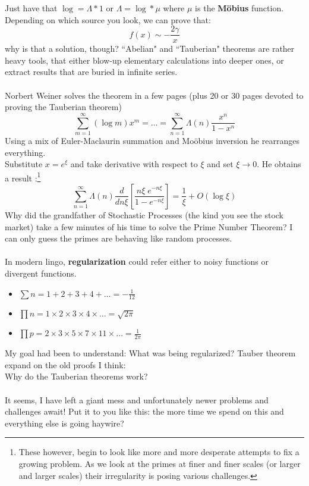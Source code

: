 \documentclass[12pt]{article}
\begin{document}
\newpage

\noindent Just have that $\log = \Lambda \ast 1$ or $\Lambda = \log \ast \mu $ where $\mu$ is the \textbf{M\"{o}bius} function.   Depending on which source you look, we can prove that:
$$ f(x) \sim -\frac{2\gamma}{x} $$
why is that a solution, though?  ``Abelian" and ``Tauberian" theorems are rather heavy tools, that either blow-up elementary calculations into deeper ones, or extract results that are buried in infinite series.  \\ \\
Norbert Weiner solves the theorem in a few pages (plus 20 or 30 pages devoted to proving the Tauberian theorem)
$$ \sum_{m=1}^\infty (\log m ) x^m = \dots = \sum_{n=1}^\infty \Lambda (n) \frac{x^n}{1-x^n} $$
Using a mix of Euler-Maclaurin summation and Mo\"{o}bius inversion he rearranges everything.\\
Substitute $x = e^\xi$ and take derivative with respect to $\xi$ and set $\xi \to 0$.  He obtains a result :\footnote{These however, begin to look like more and more desperate attempts to fix a growing problem.  As we look at the primes at finer and finer scales (or larger and larger scales) their irregularity is posing various challenges.}
$$ \sum_{n=1}^\infty \Lambda(n) \frac{d}{dn\xi} \left[ \frac{n\xi \; e^{-n\xi}}{1 - e^{-n\xi}} \right] = \frac{1}{\xi} + O(\log \xi) $$
Why did the grandfather of Stochastic Processes (the kind you see the stock market) take a few minutes of his time to solve the Prime Number Theorem?  I can only guess the primes are behaving like random processes. \\ \\
In modern lingo, \textbf{regularization} could refer either to {\color{red}noisy} functions or {\color{green}divergent} functions. 
\begin{itemize}
\item $\sum n = 1 + 2 + 3 + 4 + \dots = - \frac{1}{12} $
\item $\prod n = 1 \times 2 \times 3 \times 4 \times \dots = \sqrt{2\pi}$ \\
\item $\prod p = 2 \times 3 \times 5 \times 7 \times 11 \times \dots = \frac{1}{2\pi}$
\end{itemize}
My goal had been to understand: What was being regularized?  Tauber theorem expand on the old proofs I think:
$$  $$
Why do the Tauberian theorems work?  \\ \\
It seems, I have left a giant mess and unfortunately newer problems and challenges await!  Put it to you like this: the more time we spend on this and everything else is going haywire?
\end{document}
